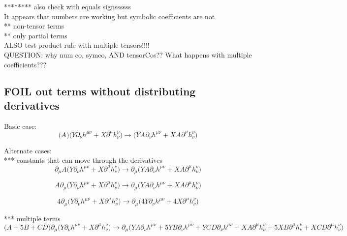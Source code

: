 \documentclass{article}
\def\){\Big)}
\def\({\Big(}
\begin{document}
******** also check with equals signssssss\\
It appears that numbers are working but symbolic coefficients are not\\
** non-tensor terms\\
** only partial terms\\

ALSO test product rule with multiple tensors!!!!\\

QUESTION: why num co, symco, AND tensorCos?? What happens with multiple coefficients???\\

 \subsection{FOIL out terms without distributing derivatives}
Basic case: 
\begin{equation}
\(A^{}\) \(Y \partial_{\nu}h^{\mu \nu} + X \partial^{\mu} h^{\nu }_{\nu}\)  \rightarrow \(Y A^{} \partial_{\nu}h^{\mu \nu} +X A^{} \partial^{\mu}h_{\nu}^{\nu} \)
\end{equation}

Alternate cases:\\
*** constants that can move through the derivatives\\
\begin{equation}
\partial_{\mu} A \(Y \partial_{\nu}h^{\mu \nu} + X \partial^{\mu} h^{\nu }_{\nu}\)   \rightarrow \partial_{\mu}\(YA \partial_{\nu}h^{\mu \nu} +XA \partial^{\mu}h_{\nu}^{\nu} \)
\end{equation}


\begin{equation}
A \partial_{\mu} \(Y \partial_{\nu}h^{\mu \nu} + X \partial^{\mu} h^{\nu }_{\nu}\) 	
\rightarrow
\partial_{\mu}\(YA \partial_{\nu}h^{\mu \nu} +XA \partial^{\mu}h_{\nu}^{\nu} \)
\end{equation}


\begin{equation}
4 \partial_{\mu}  \(Y \partial_{\nu}h^{\mu \nu} + X \partial^{\mu} h^{\nu }_{\nu}\)   \rightarrow \partial_{\mu}\(4 Y \partial_{\nu}h^{\mu \nu} +4 X \partial^{\mu}h_{\nu}^{\nu} \)
\end{equation}

*** multiple terms
\begin{equation}
\(A + 5B + CD \) \partial_{\mu} \(Y \partial_{\nu}h^{\mu \nu} + X \partial^{\mu} h^{\nu }_{\nu}\) \rightarrow
\partial_{\mu}\(YA \partial_{\nu}h^{\mu \nu} +5 YB \partial_{\nu}h^{\mu \nu} +YCD \partial_{\nu}h^{\mu \nu} +XA \partial^{\mu}h_{\nu}^{\nu} +5 XB \partial^{\mu}h_{\nu}^{\nu} +XCD \partial^{\mu}h_{\nu}^{\nu} \)
\end{equation}
\end{document}

